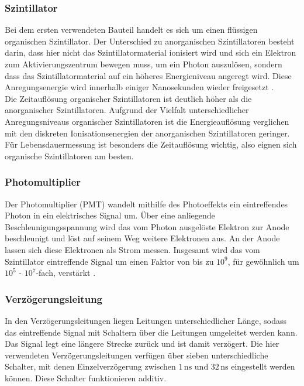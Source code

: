 \subsubsection{Szintillator}

Bei dem ersten verwendeten Bauteil handelt es sich um einen flüssigen organischen Szintillator. Der Unterschied zu anorganischen Szintillatoren besteht darin, dass hier nicht das Szintillatormaterial
ionisiert wird und sich ein Elektron zum Aktivierungszentrum bewegen muss, um ein Photon auszulösen, sondern dass das Szintillatormaterial auf ein höheres Energieniveau angeregt wird.
Diese Anregungsenergie wird innerhalb einiger Nanosekunden wieder freigesetzt \cite{kolawerm}. \\
Die Zeitauflösung organischer Szintillatoren ist deutlich höher als die anorganischer Szintillatoren.
Aufgrund der Vielfalt unterschiedlicher Anregungsniveaus organischer Szintillatoren ist die Energieauflösung verglichen mit den diskreten Ionisationsenergien der anorganischen Szintillatoren geringer.
Für Lebensdauermessung ist besonders die Zeitauflösung wichtig, also eignen sich organische Szintillatoren am besten. \\


\subsubsection{Photomultiplier}

Der Photomultiplier (PMT) wandelt mithilfe des Photoeffekts ein eintreffendes Photon in ein elektrisches Signal um.
Über eine anliegende Beschleunigungsspannung wird das vom Photon ausgelöste Elektron zur Anode beschleunigt und löst auf seinem Weg weitere Elektronen aus.
An der Anode lassen sich diese Elektronen als Strom messen.
Insgesamt wird das vom Szintillator eintreffende Signal um einen Faktor von bis zu $10^9$, für gewöhnlich um $10^5$ - $10^7$-fach, verstärkt \cite{kolawerm}.


\subsubsection{Verzögerungsleitung}

In den Verzögerungsleitungen liegen Leitungen unterschiedlicher Länge, sodass das eintreffende Signal mit Schaltern über die Leitungen umgeleitet werden kann.
Das Signal legt eine längere Strecke zurück und ist damit verzögert. Die hier verwendeten Verzögerungsleitungen verfügen über sieben unterschiedliche Schalter, mit denen Einzelverzögerung
zwischen $1 \,\unit{\nano\second}$ und $32 \,\unit{\nano\second}$ eingestellt werden können. Diese Schalter funktionieren additiv.


